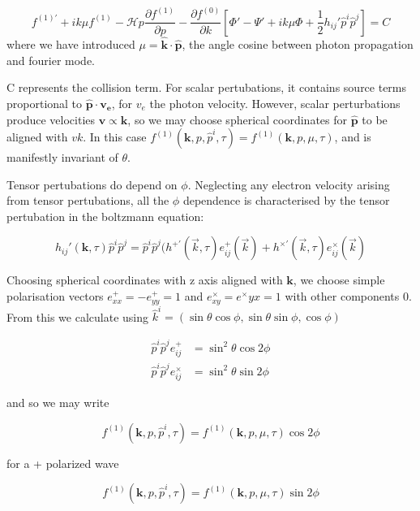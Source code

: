 \documentclass[a4paper,10pt]{article}
\renewcommand{\v}[1]{\mathbf{#1}}
\newcommand{\half}{\frac{1}{2}}
\newcommand{\unit}[1]{\hat{\v{#1}}}
\begin{document}
\begin{equation}
f^{(1)'} + ik\mu f^{(1)}-\mathcal{H}p\frac{\partial f^{(1)}}{\partial p} - \frac{\partial f^{(0)}}{\partial k} [ \Phi ' - \Psi ' + ik\mu \Phi + \half h_{ij}'\hat{p}^i\hat{p}^j] = 
C
\end{equation}
where we have introduced $\mu = \unit{k} \cdot \unit{p}$, the angle cosine between photon propagation and fourier mode.

C represents the collision term. For scalar pertubations, it contains source terms proportional to $\unit{p}\cdot\v{v_e}$, for $v_e$ the photon velocity. However, scalar perturbations produce velocities $\v{v} \propto \v{k}$, so we may choose spherical coordinates for $\unit{p}$ to be aligned with $v{k}$. In this case  $f^{(1)}(\v{k}, p, \hat{p}^i, \tau) = f^{(1)}(\v{k}, p, \mu, \tau)$, and is manifestly invariant of $\theta$.

Tensor pertubations do depend on $\phi$. Neglecting any electron velocity arising from tensor pertubations, all the $\phi$ dependence is characterised by the tensor pertubation in the boltzmann equation:

\begin{equation}
h_{ij}'(\v{k},\tau)\hat{p}^i\hat{p}^j = \hat{p}^i\hat{p}^j (h^{+'}(\vec{k},\tau)e_{ij}^+(\vec{k}) + h^{\times'}(\vec{k},\tau)e_{ij}^\times(\vec{k})
\end{equation}

Choosing spherical coordinates with z axis aligned with $\v{k}$, we choose simple polarisation vectors $e^+_{xx}=-e^+_{yy}=1$ and $e^\times_{xy}=e^\times{yx}=1$ with other components 0. From this we calculate using $\hat{k}^i = (\sin\theta\cos\phi, \sin\theta\sin\phi, \cos\phi)$

\begin{equation}\begin{split}
\hat{p}^i\hat{p}^je_{ij}^+ &= \sin^2{\theta}\cos{2\phi} \\
\hat{p}^i\hat{p}^je_{ij}^\times &= \sin^2{\theta}\sin{2\phi}
\end{split}\end{equation}

and so we may write 

\begin{equation}
f^{(1)}(\v{k}, p, \hat{p}^i, \tau) = f^{(1)}(\v{k}, p, \mu, \tau)\cos{2\phi}
\end{equation}

for a + polarized wave


\begin{equation}
f^{(1)}(\v{k}, p, \hat{p}^i, \tau) = f^{(1)}(\v{k}, p, \mu, \tau)\sin{2\phi}
\end{equation}
\end{document}
